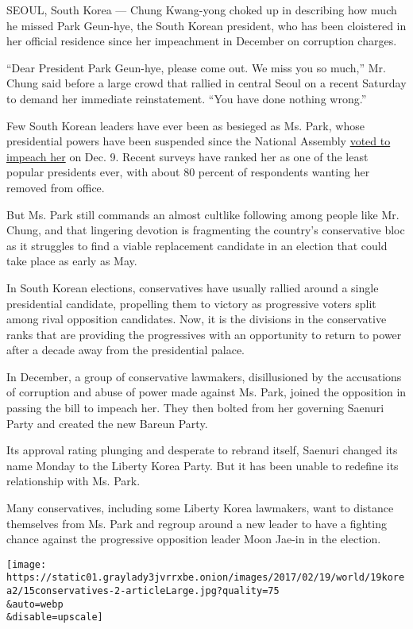 SEOUL, South Korea --- Chung Kwang-yong choked up in describing how much
he missed Park Geun-hye, the South Korean president, who has been
cloistered in her official residence since her impeachment in December
on corruption charges.

``Dear President Park Geun-hye, please come out. We miss you so much,''
Mr. Chung said before a large crowd that rallied in central Seoul on a
recent Saturday to demand her immediate reinstatement. ``You have done
nothing wrong.''

Few South Korean leaders have ever been as besieged as Ms. Park, whose
presidential powers have been suspended since the National Assembly
\href{https://www.nytimes3xbfgragh.onion/2016/12/09/world/asia/south-korea-president-park-geun-hye-impeached.html}{voted
to impeach her} on Dec. 9. Recent surveys have ranked her as one of the
least popular presidents ever, with about 80 percent of respondents
wanting her removed from office.

But Ms. Park still commands an almost cultlike following among people
like Mr. Chung, and that lingering devotion is fragmenting the country's
conservative bloc as it struggles to find a viable replacement candidate
in an election that could take place as early as May.

In South Korean elections, conservatives have usually rallied around a
single presidential candidate, propelling them to victory as progressive
voters split among rival opposition candidates. Now, it is the divisions
in the conservative ranks that are providing the progressives with an
opportunity to return to power after a decade away from the presidential
palace.

In December, a group of conservative lawmakers, disillusioned by the
accusations of corruption and abuse of power made against Ms. Park,
joined the opposition in passing the bill to impeach her. They then
bolted from her governing Saenuri Party and created the new Bareun
Party.

Its approval rating plunging and desperate to rebrand itself, Saenuri
changed its name Monday to the Liberty Korea Party. But it has been
unable to redefine its relationship with Ms. Park.

Many conservatives, including some Liberty Korea lawmakers, want to
distance themselves from Ms. Park and regroup around a new leader to
have a fighting chance against the progressive opposition leader Moon
Jae-in in the election.

\texttt{[image: https://static01.graylady3jvrrxbe.onion/images/2017/02/19/world/19korea2/15conservatives-2-articleLarge.jpg?quality=75\\\&auto=webp\\\&disable=upscale]}

